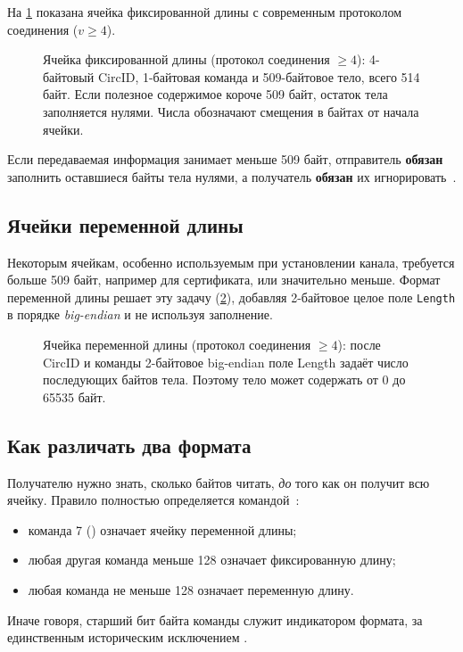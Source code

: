 На \cref{fig:cella-fissa} показана ячейка фиксированной длины с современным протоколом соединения ($v\ge4$).

\begin{figure}[htbp]
\centering

\caption{Ячейка фиксированной длины (протокол соединения $\ge 4$): 4-байтовый CircID, 1-байтовая команда и 509-байтовое тело, всего 514 байт. Если полезное содержимое короче 509 байт, остаток тела заполняется нулями. Числа обозначают смещения в байтах от начала ячейки.}
\label{fig:cella-fissa}
\end{figure}

Если передаваемая информация занимает меньше 509 байт, отправитель \textbf{обязан} заполнить оставшиеся байты тела нулями, а получатель \textbf{обязан} их игнорировать~.

\subsection{Ячейки переменной длины}

Некоторым ячейкам, особенно используемым при установлении канала, требуется больше 509 байт, например для сертификата, или значительно меньше. Формат переменной длины решает эту задачу (\cref{fig:cella-variabile}), добавляя 2-байтовое целое поле \texttt{Length} в порядке \emph{big-endian} и не используя заполнение.

\begin{figure}[htbp]
\centering

\caption{Ячейка переменной длины (протокол соединения $\ge 4$): после CircID и команды 2-байтовое big-endian поле Length задаёт число последующих байтов тела. Поэтому тело может содержать от 0 до \num{65535} байт.}
\label{fig:cella-variabile}
\end{figure}

\subsection{Как различать два формата}

Получателю нужно знать, сколько байтов читать, \emph{до} того как он получит всю ячейку. Правило полностью определяется командой~:
\begin{itemize}
  \item команда 7 () означает ячейку переменной длины;
  \item любая другая команда меньше 128 означает фиксированную длину;
  \item любая команда не меньше 128 означает переменную длину.
\end{itemize}
Иначе говоря, старший бит байта команды служит индикатором формата, за единственным историческим исключением .

